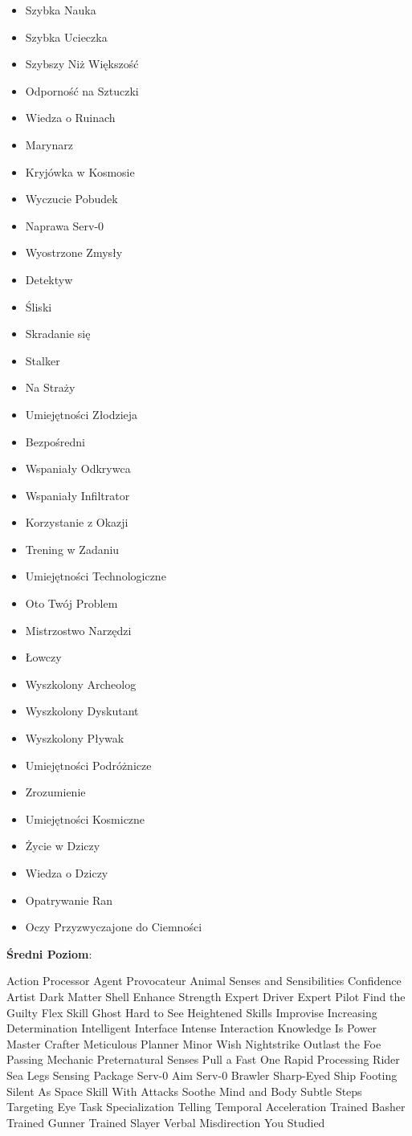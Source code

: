 \begin{itemize}
\item Szybka Nauka
\item Szybka Ucieczka
\item Szybszy Niż Większość
\item Odporność na Sztuczki
\item Wiedza o Ruinach
\item Marynarz
\item Kryjówka w Kosmosie
\item Wyczucie Pobudek
\item Naprawa Serv-0
\item Wyostrzone Zmysły
\item Detektyw
\item Śliski
\item Skradanie się
\item Stalker
\item Na Straży
\item Umiejętności Złodzieja
\item Bezpośredni 
\item Wspaniały Odkrywca
\item Wspaniały Infiltrator
\item Korzystanie z Okazji
\item Trening w Zadaniu
\item Umiejętności Technologiczne
\item Oto Twój Problem
\item Mistrzostwo Narzędzi
\item Łowczy
\item Wyszkolony Archeolog
\item Wyszkolony Dyskutant
\item Wyszkolony Pływak
\item Umiejętności Podróżnicze
\item Zrozumienie
\item Umiejętności Kosmiczne
\item Życie w Dziczy
\item Wiedza o Dziczy
\item Opatrywanie Ran
\item Oczy Przyzwyczajone do Ciemności
\end{itemize}

\textbf{Średni Poziom}:

Action Processor
Agent Provocateur
Animal Senses and Sensibilities
Confidence Artist
Dark Matter Shell
Enhance Strength
Expert Driver
Expert Pilot
Find the Guilty
Flex Skill
Ghost
Hard to See
Heightened Skills
Improvise
Increasing Determination
Intelligent Interface
Intense Interaction
Knowledge Is Power
Master Crafter
Meticulous Planner
Minor Wish
Nightstrike
Outlast the Foe
Passing Mechanic
Preternatural Senses
Pull a Fast One
Rapid Processing
Rider
Sea Legs
Sensing Package
Serv-0 Aim
Serv-0 Brawler
Sharp-Eyed
Ship Footing
Silent As Space
Skill With Attacks
Soothe Mind and Body
Subtle Steps
Targeting Eye
Task Specialization
Telling
Temporal Acceleration
Trained Basher
Trained Gunner
Trained Slayer
Verbal Misdirection
You Studied

